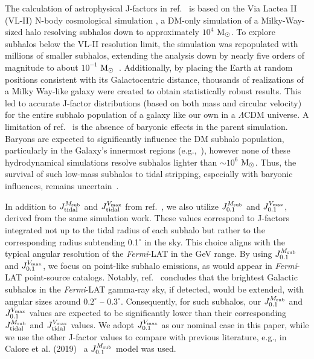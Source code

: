 \documentclass[12pt, a4paper]{article}
\newcommand{\Fermi}{{\sl Fermi}}
\newcommand{\Msub}{M_{\rm sub}}
\newcommand{\Vmax}{V_{\rm max}}
\begin{document}
The calculation of astrophysical J-factors in ref.~\cite{2024MNRAS.530.2496A} is based on the Via Lactea II (VL-II) N-body cosmological simulation \cite{2007ApJ...667..859D}, a DM-only simulation of a Milky-Way-sized halo resolving subhalos down to approximately $10^4$ ${\rm M}_{\odot}$. 
To explore subhalos below the VL-II resolution limit, 
the simulation was repopulated with millions of smaller subhalos, extending the analysis down by nearly five orders of magnitude 
to about $10^{-1}$ ${\rm M}_{\odot}$~\cite{2022PhRvD.105h3006C}.
Additionally, by placing the Earth at random positions consistent with its Galactocentric distance, 
thousands of realizations of a Milky Way-like galaxy were created to obtain statistically robust results. 
This led to accurate J-factor distributions (based on both mass and circular velocity) for the entire subhalo population of a galaxy like our own in a $\Lambda$CDM universe. A limitation of ref.~\cite{2024MNRAS.530.2496A} is the absence of baryonic effects in the parent simulation. Baryons are expected to significantly influence the DM subhalo population, particularly in the Galaxy's innermost regions (e.g.,~\cite{2019MNRAS.487.4409K,2017MNRAS.471.1709G,2021MNRAS.501.3558G}), however none of these hydrodynamical simulations resolve subhalos lighter than $\sim 10^6$ ${\rm M}_{\odot}$. Thus, the survival of such low-mass subhalos to tidal stripping, especially with baryonic influences, remains uncertain~\cite{2018MNRAS.474.3043V,2020MNRAS.491.4591E,2023MNRAS.518...93A}.

In addition to $J_{\rm tidal}^{\Msub}$ and $J_{\rm tidal}^{\Vmax}$ from ref.~\cite{2024MNRAS.530.2496A}, we also utilize $J_{0.1}^{\Msub}$ and $J_{0.1}^{\Vmax}$, derived from the same simulation work. These values correspond to J-factors integrated not up to the tidal radius of each subhalo but rather to the corresponding radius subtending 0.1$^\circ$ in the sky. 
This choice aligns with the typical angular resolution of the {\Fermi}-LAT in the GeV range. By using $J_{0.1}^{\Msub}$ and $J_{0.1}^{\Vmax}$, we focus on point-like subhalo emissions, as would appear in \Fermi-LAT point-source catalogs. 
Notably, ref.~\cite{2022PhRvD.105h3006C} concludes that the brightest Galactic subhalos in the \Fermi-LAT gamma-ray sky, if detected, would be extended, with angular sizes around $0.2^\circ$ – $0.3^\circ$. 
Consequently, for such subhalos, our $J_{0.1}^{\Msub}$ and $J_{0.1}^{\Vmax}$ values are expected to be significantly lower than their corresponding $J_{\rm tidal}^{\Msub}$ and $J_{\rm tidal}^{\Vmax}$ values. 
We adopt $J_{0.1}^{\Vmax}$ as our nominal case in this paper, while we use the other J-factor values to compare with previous literature, e.g., in Calore et al. (2019)~\cite{2019Galax...7...90C} a $J_{0.1}^{M_{\rm sub}}$ model was used.
\end{document}
